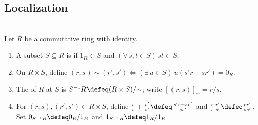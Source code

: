 \subsection{Localization}

\begin{definition} \label{def:ring-localization} \\
Let $R$ be a commutative ring with identity.
\begin{enumerate}[label=(\roman*)]
\setlength{\itemsep}{0pt}
\item A subset $S\subseteq R$ is  if $1_R\in S$ and $(\forall\,s,t\in S)\,st\in S$.
\item On $R\times S$, define $(r,s)\sim(r',s')\Longleftrightarrow(\exists\,u\in S)\,u(s'r-sr')=0_R$.
\item The  of $R$ at $S$ is $S^{-1}R\defeq(R\times S)/{\sim}$; write $[(r,s)]_{\sim}=r/s$.
\item For $(r,s),(r',s')\in R\times S$, define $\frac{r}{s}+\frac{r'}{s'}\defeq\frac{s'r+sr'}{ss'}$ and $\frac{r}{s}\frac{r'}{s'}\defeq\frac{rr'}{ss'}$. Set $0_{S^{-1}R}\defeq 0_R/1_R$ and $1_{S^{-1}R}\defeq 1_R/1_R$.
\end{enumerate}
\end{definition}

